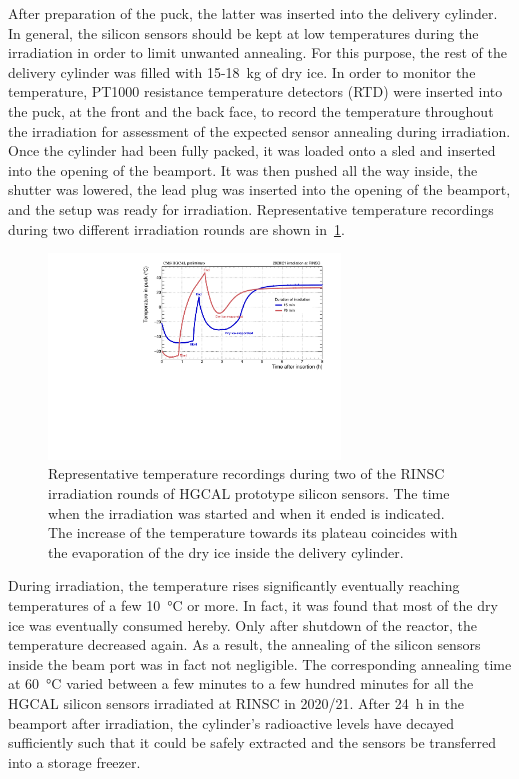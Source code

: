 After preparation of the puck, the latter was inserted into the delivery cylinder.
In general, the silicon sensors should be kept at low temperatures during the irradiation in order to limit unwanted annealing.
For this purpose, the rest of the delivery cylinder was filled with 15-\SI{18}{\kilo\gram} of dry ice.
In order to monitor the temperature, PT1000 resistance temperature detectors (RTD) were inserted into the puck, at the front and the back face, to record the temperature throughout the irradiation for assessment of the expected sensor annealing during irradiation. 
Once the cylinder had been fully packed, it was loaded onto a sled and inserted into the opening of the beamport.
It was then pushed all the way inside, the shutter was lowered, the lead plug was inserted into the opening of the beamport, and the setup was ready for irradiation.
Representative temperature recordings during two different irradiation rounds are shown in~\ref{fig:Round_10_Temperature_Profile}.
\begin{figure}[!hbt]
  \begin{center}
    \includegraphics[width=0.69\textwidth]{plots/RINSC_temp/RINSC_temp.pdf}
    \caption{Representative temperature recordings during two of the RINSC irradiation rounds of HGCAL prototype silicon sensors. 
    The time when the irradiation was started and when it ended is indicated.
    The increase of the temperature towards its plateau coincides with the evaporation of the dry ice inside the delivery cylinder.
    }
    \label{fig:Round_10_Temperature_Profile}
  \end{center}
\end{figure}
During irradiation, the temperature rises significantly eventually reaching temperatures of a few \SI{+10}{\celsius} or more.
In fact, it was found that most of the dry ice was eventually consumed hereby.
Only after shutdown of the reactor, the temperature decreased again.
As a result, the annealing of the silicon sensors inside the beam port was in fact not negligible.
The corresponding annealing time at \SI{60}{\celsius} varied between a few minutes to a few hundred minutes for all the HGCAL silicon sensors irradiated at RINSC in 2020/21.
After \SI{24}{\hour} in the beamport after irradiation, the cylinder's radioactive levels have decayed sufficiently such that it could be safely extracted and the sensors be transferred into a storage freezer.

